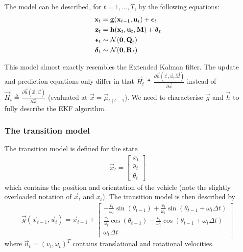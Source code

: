 The model can be described, for $t = 1, \dotsc, T$, by the following equations:
\begin{align}
	\boldsymbol{\mathbf{x}}_t 			&= \boldsymbol{\mathbf{g}}(\boldsymbol{\mathbf{x}}_{t - 1}, \boldsymbol{\mathbf{u}}_t) + \boldsymbol{\mathbf{\epsilon}}_t \\
	\boldsymbol{\mathbf{z}}_t 			&= \boldsymbol{\mathbf{h}}(\boldsymbol{\mathbf{x}}_t, \boldsymbol{\mathbf{u}}_t, \boldsymbol{\mathbf{M}}) + \boldsymbol{\mathbf{\delta}}_t \\
	\boldsymbol{\mathbf{\epsilon}}_t 	&\sim \operatorname{\mathcal N}(\boldsymbol{\mathbf{0}}, \boldsymbol{\mathbf{Q}}_t) \\
	\boldsymbol{\mathbf{\delta}}_t		&\sim \operatorname{\mathcal N}(\boldsymbol{\mathbf{0}}, \boldsymbol{\mathbf{R}}_t)
\end{align}

This model almost exactly resembles the Extended Kalman filter. The update and prediction equations only differ in that
$\vec H_t \triangleq \frac{\partial \vec h(\vec x, \vec u, \vec M)}{\partial \vec x}$ instead of $\vec H_t \triangleq \frac{\partial \vec h(\vec x, \vec u)}{\partial \vec x}$ (evaluated at $\vec x = \vec \mu_{t \mid t - 1}$). We need to characterise $\vec g$ and $\vec h$ to fully describe the EKF algorithm.

\subsubsection{The transition model}
The transition model is defined for the state
\begin{align}
	\vec x_t = 
		\begin{bmatrix}
			x_t \\
			y_t \\
			\theta_t
		\end{bmatrix}
\end{align}
which contains the position and orientation of the vehicle (note the slightly overloaded notation of $\vec x_t$ and $x_t$). The transition model is then described by
\begin{align}
	\vec g(\vec x_{t - 1}, \vec u_t) = \vec x_{t - 1} + 
		\begin{bmatrix}
			-\frac{v_t}{\omega_t} \sin(\theta_{t - 1}) + \frac{v_t}{\omega_t} \sin(\theta_{t - 1} + \omega_t \Delta t) \\
			\frac{v_t}{\omega_t} \cos(\theta_{t - 1}) - \frac{v_t}{\omega_t} \cos(\theta_{t - 1} + \omega_t \Delta t) \\
			\omega_t \Delta t
		\end{bmatrix}
\end{align}
where $\vec u_t = (v_t, \omega_t)^T$ contains translational and rotational velocities.

